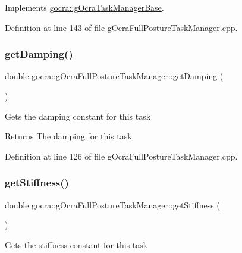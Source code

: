 Implements \hyperlink{classgocra_1_1gOcraTaskManagerBase_a7cf9111e69aee47a39fe0f2976a20d6c}{gocra\+::g\+Ocra\+Task\+Manager\+Base}.



Definition at line 143 of file g\+Ocra\+Full\+Posture\+Task\+Manager.\+cpp.

\hypertarget{classgocra_1_1gOcraFullPostureTaskManager_a946558f7ec0b0c58cbb3b83d19c4aad1}{}\label{classgocra_1_1gOcraFullPostureTaskManager_a946558f7ec0b0c58cbb3b83d19c4aad1} 
\subsubsection{\texorpdfstring{get\+Damping()}{getDamping()}}
{\footnotesize\ttfamily double gocra\+::g\+Ocra\+Full\+Posture\+Task\+Manager\+::get\+Damping (\begin{DoxyParamCaption}{ }\end{DoxyParamCaption})}

Gets the damping constant for this task

\begin{DoxyReturn}{Returns}
The damping for this task 
\end{DoxyReturn}


Definition at line 126 of file g\+Ocra\+Full\+Posture\+Task\+Manager.\+cpp.

\hypertarget{classgocra_1_1gOcraFullPostureTaskManager_a34270c93e3c25b35c54e618d5af964d0}{}\label{classgocra_1_1gOcraFullPostureTaskManager_a34270c93e3c25b35c54e618d5af964d0} 
\subsubsection{\texorpdfstring{get\+Stiffness()}{getStiffness()}}
{\footnotesize\ttfamily double gocra\+::g\+Ocra\+Full\+Posture\+Task\+Manager\+::get\+Stiffness (\begin{DoxyParamCaption}{ }\end{DoxyParamCaption})}

Gets the stiffness constant for this task

